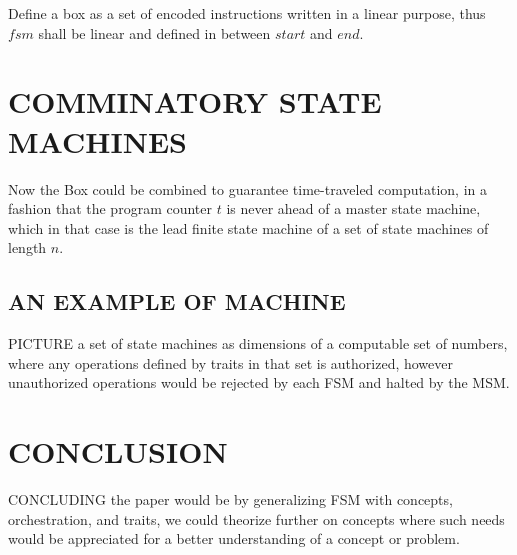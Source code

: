 \documentclass[10pt, twocolumn]{article}
\theoremstyle{plain}
\theoremstyle{definition}
\theoremstyle{remark}
\begin{document}
Define a box as a set of encoded instructions written in a linear purpose, thus $fsm$ shall be linear and defined in between $start$ and $end$.

\section{COMMINATORY STATE MACHINES}

Now the Box could be combined to guarantee time-traveled computation, in a fashion that the program counter $t$ is never ahead of a master state machine, which in that case is the lead finite state machine of a set of state machines of length $n$.

\subsection{AN EXAMPLE OF MACHINE}

\lettrine[lines=1,loversize=-.4]{P}{ICTURE} a set of state machines as dimensions of a computable set of numbers, where any operations defined by traits in that set is authorized, however unauthorized operations would be rejected by each FSM and halted by the MSM.

\section{CONCLUSION}

\lettrine[lines=1,loversize=-.4]{C}{ONCLUDING} the paper would be by generalizing FSM with concepts, orchestration, and traits, we could theorize further on concepts where such needs would be appreciated for a better understanding of a concept or problem. 
\end{document}
